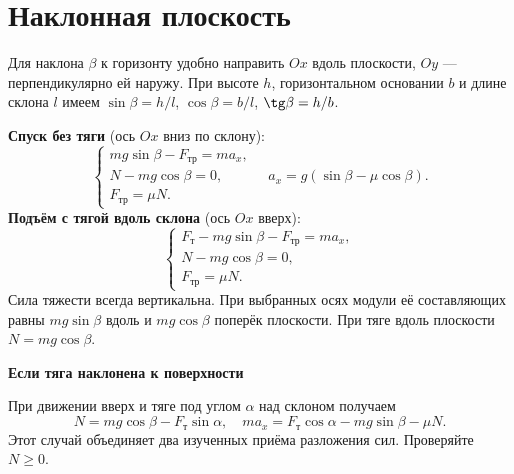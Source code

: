 \documentclass[a4paper,12pt]{article}
\newcommand{\fr}{F_{\text{тр}}}
\newcommand{\ft}{F_{\text{т}}}
\newcommand{\unit}[1]{\,\text{#1}}
\newcommand{\N}{\unit{Н}}
\newcommand{\example}[1]{\par\medskip\textbf{\textcolor{darkaccent}{#1}}\par}
\begin{document}
\section{Наклонная плоскость}
Для наклона $\beta$ к горизонту удобно направить $Ox$ вдоль плоскости, $Oy$ --- перпендикулярно ей наружу. При высоте $h$, горизонтальном основании $b$ и длине склона $l$ имеем $\sin\beta=h/l$, $\cos\beta=b/l$, $\tg\beta=h/b$.
\begin{center}
\end{center}
\textbf{Спуск без тяги} (ось $Ox$ вниз по склону):
\[\begin{cases}mg\sin\beta-\fr=ma_x,\\N-mg\cos\beta=0,\\\fr=\mu N.\end{cases}\quad a_x=g(\sin\beta-\mu\cos\beta).\]
\textbf{Подъём с тягой вдоль склона} (ось $Ox$ вверх):
\[\begin{cases}\ft-mg\sin\beta-\fr=ma_x,\\N-mg\cos\beta=0,\\\fr=\mu N.\end{cases}\]
Сила тяжести всегда вертикальна. При выбранных осях модули её составляющих равны $mg\sin\beta$ вдоль и $mg\cos\beta$ поперёк плоскости. При тяге вдоль плоскости $N=mg\cos\beta$.
\example{Если тяга наклонена к поверхности}
При движении вверх и тяге под углом $\alpha$ над склоном получаем
\[N=mg\cos\beta-\ft\sin\alpha,\quad
ma_x=\ft\cos\alpha-mg\sin\beta-\mu N.\]
Этот случай объединяет два изученных приёма разложения сил. Проверяйте $N\ge0$.
\clearpage
\end{document}
